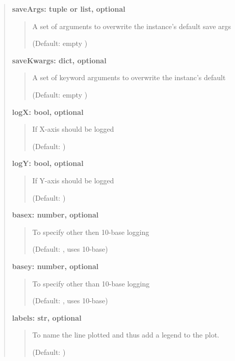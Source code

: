 \documentclass[letterpaper,10pt,english]{sphinxmanual}
\begin{document}
\begin{fulllineitems}
\begin{fulllineitems}
\begin{quote}
\begin{description}
\textbf{saveArgs: tuple or list, optional}
\begin{quote}

A set of arguments to overwrite the instance's default save args

(Default: empty )
\end{quote}

\textbf{saveKwargs: dict, optional}
\begin{quote}

A set of keyword arguments to overwrite the instanc's default

(Default: empty )
\end{quote}

\textbf{logX: bool, optional}
\begin{quote}

If X-axis should be logged

(Default: )
\end{quote}

\textbf{logY: bool, optional}
\begin{quote}

If Y-axis should be logged

(Default: )
\end{quote}

\textbf{basex: number, optional}
\begin{quote}

To specify other then 10-base logging

(Default: , uses 10-base)
\end{quote}

\textbf{basey: number, optional}
\begin{quote}

To specify other than 10-base logging

(Default: , uses 10-base)
\end{quote}

\textbf{labels: str, optional}
\begin{quote}

To name the line plotted and thus add a legend to the plot.

(Default: )
\end{quote}

\end{description}\end{quote}

\end{fulllineitems}


\end{fulllineitems}
\end{document}
